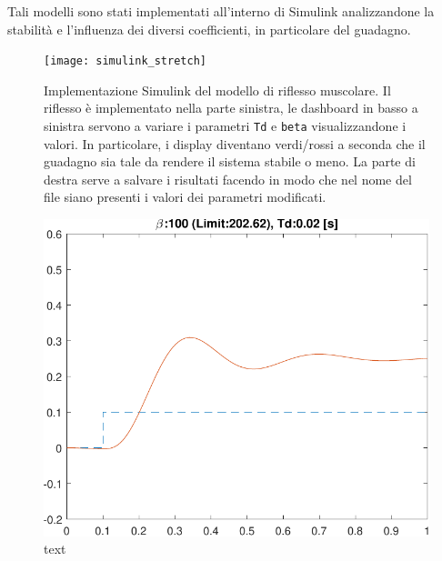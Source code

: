 Tali modelli sono stati implementati all'interno di Simulink analizzandone la stabilità e l'influenza dei diversi coefficienti, in particolare del guadagno.

\begin{figure}[t!]
	\centering
	\texttt{[image: simulink\_stretch]}
	\caption{Implementazione Simulink del modello di riflesso muscolare. Il riflesso è implementato nella parte sinistra, le dashboard in basso a sinistra servono a variare i parametri \texttt{Td} e \texttt{beta} visualizzandone i valori. In particolare, i display diventano verdi/rossi a seconda che il guadagno sia tale da rendere il sistema stabile o meno. La parte di destra serve a salvare i risultati facendo in modo che nel nome del file siano presenti i valori dei parametri modificati.}
	\label{fig:simulink_stretch}
\end{figure}

\begin{figure}
	\centering
\includegraphics[width=0.95\linewidth]{../code/stretch/figs/result_gain_100_Td_0.02}
\caption{text}
\end{figure}

